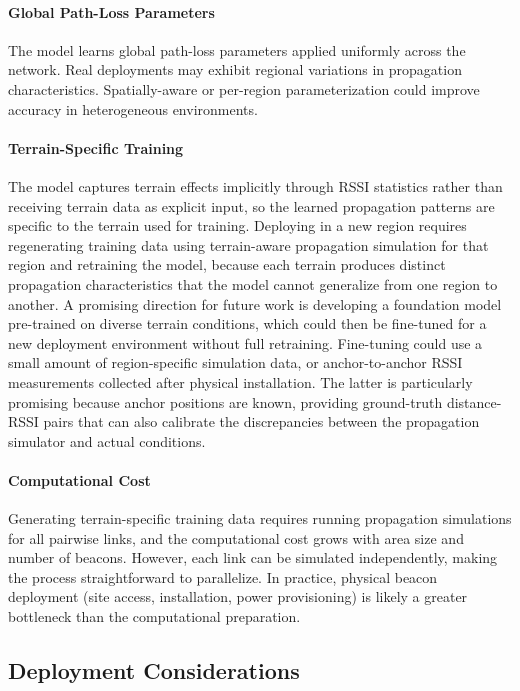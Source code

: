 \documentclass[master,final,11pt]{iscs-thesis}
\begin{document}
\paragraph{Global Path-Loss Parameters}
The model learns global path-loss parameters applied uniformly across the network.
Real deployments may exhibit regional variations in propagation characteristics.
Spatially-aware or per-region parameterization could improve accuracy in heterogeneous environments.

\paragraph{Terrain-Specific Training}
The model captures terrain effects implicitly through RSSI statistics rather than receiving terrain data as explicit input, so the learned propagation patterns are specific to the terrain used for training.
Deploying in a new region requires regenerating training data using terrain-aware propagation simulation for that region and retraining the model, because each terrain produces distinct propagation characteristics that the model cannot generalize from one region to another.
A promising direction for future work is developing a foundation model pre-trained on diverse terrain conditions, which could then be fine-tuned for a new deployment environment without full retraining.
Fine-tuning could use a small amount of region-specific simulation data, or anchor-to-anchor RSSI measurements collected after physical installation.
The latter is particularly promising because anchor positions are known, providing ground-truth distance-RSSI pairs that can also calibrate the discrepancies between the propagation simulator and actual conditions.

\paragraph{Computational Cost}
Generating terrain-specific training data requires running propagation simulations for all pairwise links, and the computational cost grows with area size and number of beacons.
However, each link can be simulated independently, making the process straightforward to parallelize.
In practice, physical beacon deployment (site access, installation, power provisioning) is likely a greater bottleneck than the computational preparation.

\subsection{Deployment Considerations}
\end{document}
